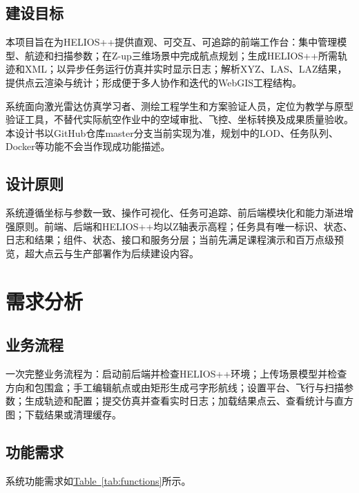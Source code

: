 \documentclass[a4paper,fleqn]{cas-sc}
\newcommand{\refTab}[1]{\hyperref[#1]{Table~\ref*{#1}}}
\begin{document}
\subsection{建设目标}

本项目旨在为HELIOS++提供直观、可交互、可追踪的前端工作台：集中管理模型、航迹和扫描参数；在Z-up三维场景中完成航点规划；生成HELIOS++所需轨迹和XML；以异步任务运行仿真并实时显示日志；解析XYZ、LAS、LAZ结果，提供点云渲染与统计；形成便于多人协作和迭代的WebGIS工程结构。

系统面向激光雷达仿真学习者、测绘工程学生和方案验证人员，定位为教学与原型验证工具，不替代实际航空作业中的空域审批、飞控、坐标转换及成果质量验收。本设计书以GitHub仓库master分支当前实现为准，规划中的LOD、任务队列、Docker等功能不会当作现成功能描述。

\subsection{设计原则}

系统遵循坐标与参数一致、操作可视化、任务可追踪、前后端模块化和能力渐进增强原则。前端、后端和HELIOS++均以Z轴表示高程；任务具有唯一标识、状态、日志和结果；组件、状态、接口和服务分层；当前先满足课程演示和百万点级预览，超大点云与生产部署作为后续建设内容。

\section{需求分析}

\subsection{业务流程}

一次完整业务流程为：启动前后端并检查HELIOS++环境；上传场景模型并检查方向和包围盒；手工编辑航点或由矩形生成弓字形航线；设置平台、飞行与扫描参数；生成轨迹和配置；提交仿真并查看实时日志；加载结果点云、查看统计与直方图；下载结果或清理缓存。

\subsection{功能需求}

系统功能需求如\refTab{tab:functions}所示。
\end{document}
